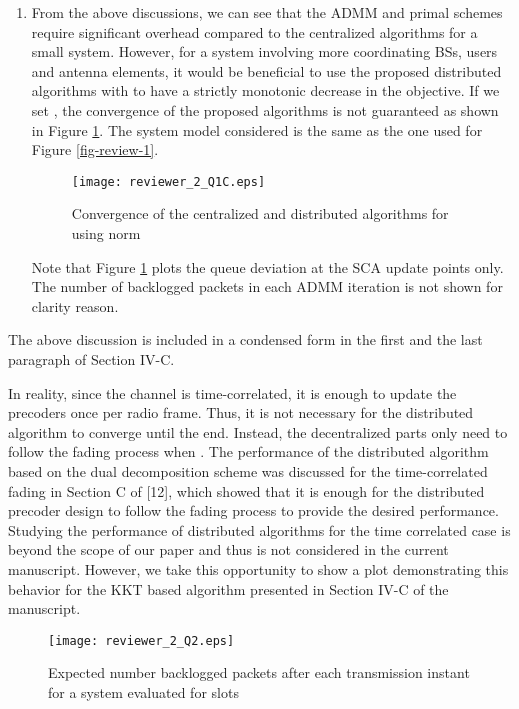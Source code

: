 \begin{enumerate}
\begin{enumerate}
		\item From the above discussions, we can see that the \ac{ADMM} and primal schemes require significant overhead compared to the centralized algorithms for a small system. However, for a system involving more coordinating \acp{BS}, users and antenna elements, it would be beneficial to use the proposed distributed algorithms with  to have a strictly monotonic decrease in the objective. If we set , the convergence of the proposed algorithms is not guaranteed as shown in Figure \ref{fig-review-2-a}. The system model considered is the same as the one used for Figure \ref{fig-review-1}.
		\begin{figure}[h!]
			\centering
			\texttt{[image: reviewer\_2\_Q1C.eps]}
			\caption{Convergence of the centralized and distributed algorithms for  using  norm}
			\label{fig-review-2-a}
		\end{figure}
		Note that Figure \ref{fig-review-2-a} plots the queue deviation at the \ac{SCA} update points only. The number of backlogged packets in each \ac{ADMM} iteration is not shown for clarity reason.		
		
	\end{enumerate}
	
	The above discussion is included in a condensed form in the first and the last paragraph of Section IV-C. 
	
	In reality, since the channel is time-correlated, it is enough to update the precoders once per radio frame. Thus, it is not necessary for the distributed algorithm to converge until the end. Instead, the decentralized parts only need to follow the fading process when . The performance of the distributed algorithm based on the dual decomposition scheme was discussed for the time-correlated fading in Section C of [12], which showed that it is enough for the distributed precoder design to follow the fading process to provide the desired performance. Studying the performance of distributed algorithms for the time correlated case is beyond the scope of our paper and thus is not considered in the current manuscript. However, we take this opportunity to show a plot demonstrating this behavior for the \ac{KKT} based algorithm presented in Section IV-C of the manuscript.
	\begin{figure}[h!]
		\centering
		\texttt{[image: reviewer\_2\_Q2.eps]}
		\caption{Expected number backlogged packets after each transmission instant for a system  evaluated for  slots}
		\label{fig-review-2}
	\end{figure}
	

\end{enumerate}
